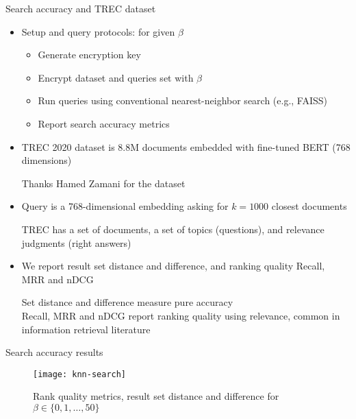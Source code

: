 	\begin{frame}{Search accuracy and TREC dataset}

		\begin{itemize}
			\item<1->
				Setup and query protocols: for given $\beta$
				\begin{itemize}
					\item Generate encryption key
					\item Encrypt dataset and queries set with $\beta$
					\item Run queries using conventional nearest-neighbor search (e.g., FAISS)
					\item Report search accuracy metrics
				\end{itemize}

			\item<2->
				TREC 2020 dataset is 8.8M documents embedded with fine-tuned BERT (768 dimensions) \\
				\begin{small}
					\indent{} Thanks Hamed Zamani for the dataset
				\end{small}

			\item<3->
				Query is a 768-dimensional embedding asking for $k = \num{1000}$ closest documents \\
				\begin{small}
					\indent{} TREC has a set of documents, a set of topics (questions), and relevance judgments (right answers)
				\end{small}

			\item<4->
				We report result set distance and difference, and ranking quality Recall, MRR and nDCG \\
				\begin{small}
					\indent{} Set distance and difference measure pure \knn{} accuracy \\
					\indent{} Recall, MRR and nDCG report ranking quality using relevance, common in information retrieval literature
				\end{small}

		\end{itemize}

	\end{frame}

	\begin{frame}{Search accuracy results}

		\begin{figure}[h]
			\centering
			\texttt{[image: knn-search]}
			\caption{Rank quality metrics, result set distance and difference for $\beta \in \{ 0, 1, \ldots , 50 \} $}
		\end{figure}

	\end{frame}

